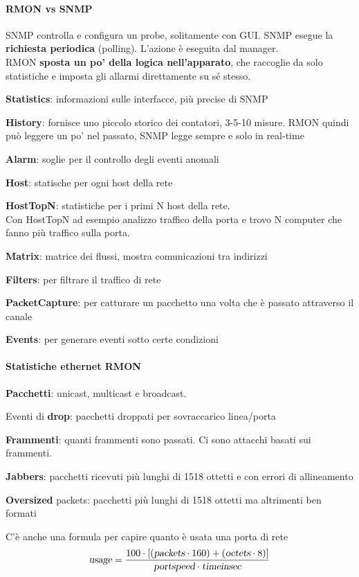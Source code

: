 \documentclass[10pt]{book}
\begin{document}
\paragraph{RMON vs SNMP} SNMP controlla e configura un probe, solitamente con GUI. SNMP esegue la \textbf{richiesta periodica} (polling). L'azione è eseguita dal manager.\\
RMON \textbf{sposta un po' della logica nell'apparato}, che raccoglie da solo statistiche e imposta gli allarmi direttamente su sé stesso.
\begin{list}{}{\textbf{Gruppi RMON}}
	\item \textbf{Statistics}: informazioni sulle interfacce, più precise di SNMP
	\item \textbf{History}: fornisce uno piccolo storico dei contatori, 3-5-10 misure. RMON quindi può leggere un po' nel passato, SNMP legge sempre e solo in real-time
	\item \textbf{Alarm}: soglie per il controllo degli eventi anomali
	\item \textbf{Host}: statische per ogni host della rete
	\item \textbf{HostTopN}: statistiche per i primi N host della rete.\\Con HostTopN ad esempio analizzo traffico della porta e trovo N computer che fanno più traffico sulla porta.
	\item \textbf{Matrix}: matrice dei flussi, mostra comunicazioni tra indirizzi
	\item \textbf{Filters}: per filtrare il traffico di rete
	\item \textbf{PacketCapture}: per catturare un pacchetto una volta che è passato attraverso il canale
	\item \textbf{Events}: per generare eventi sotto certe condizioni
\end{list}
\paragraph{Statistiche ethernet RMON}
\begin{list}{}{Informazioni di basso livello}
	\item \textbf{Pacchetti}: unicast, multicast e broadcast.
	\item Eventi di \textbf{drop}: pacchetti droppati per sovraccarico linea/porta
	\item \textbf{Frammenti}: quanti frammenti sono passati. Ci sono attacchi basati sui frammenti.
	\item \textbf{Jabbers}: pacchetti ricevuti più lunghi di 1518 ottetti e con errori di allineamento
	\item \textbf{Oversized} packets: pacchetti più lunghi di 1518 ottetti ma altrimenti ben formati
\end{list}
C'è anche una formula per capire quanto è usata una porta di rete
$$\textsl{usage}=\frac{100\cdot\left[\left(\textsl{packets} \cdot 160\right)+\left(\textsl{octets} \cdot 8\right)\right]}{\textsl{portspeed} \cdot \textsl{timeinsec}}$$
\end{document}
